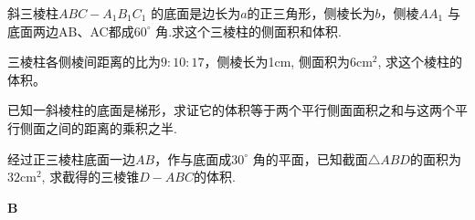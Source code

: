 \begin{enumerate}
    \item 
斜三棱柱$ABC-A_{1}B_{1}C_{1}$ 的底面是边长为$a$的正三角形，侧棱长为$b$，侧棱$AA_{1}$ 与底面两边AB、AC都成$60^{\circ}$ 角.求这个三棱柱的侧面积和体积.

\noindent
\begin{minipage}{.6\textwidth}
   \item 三棱柱各侧棱间距离的比为$9:10:17$，侧棱长为1cm, 侧面积为$6\mathrm{cm}^{2}$, 求这个棱柱的体积。
   \item 已知一斜棱柱的底面是梯形，求证它的体积等于两个平行侧面面积之和与这两个平行侧面之间的距离的乘积之半.
\item 经过正三棱柱底面一边$AB$，作与底面成$30^{\circ}$ 角的平面，已知截面$\triangle ABD$的面积为$32\mathrm{cm}^{2}$, 求截得的三棱锥$D-ABC$的体积.    
\end{minipage}\hfill
\begin{minipage}{.3\textwidth}
\centering
\end{minipage}

\end{enumerate}

\begin{center}
    \bfseries B
\end{center}

